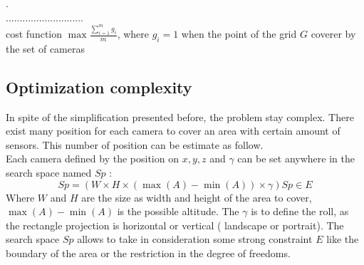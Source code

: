 .\\............................\\
 cost function  
 $\max{\frac{\sum^m_{i=1}{g_i}}{m}}$, where $g_i = 1$ when the point of the grid $G$ coverer by the set of cameras


%    


 
 \subsection{Optimization complexity} \label{sec:OptimizationComplexity}
 
In spite of the simplification presented before, the problem stay complex. There exist many position for each camera to cover an area with certain amount of sensors. This number of position can be estimate as follow.\\   
Each camera defined by the position on $x, y, z $ and $ \gamma$ can be set anywhere in the search space  named $Sp$ : 
\begin{equation}\label{eq:SearchSpace}
 Sp=(W\times H \times ( \max(A)-\min(A)) \times \gamma )  Sp \in E 
\end{equation}
Where $W$ and $H$ are the size as width and height of the area to cover, $\max(A)-\min(A)$  is the possible altitude. The $\gamma$ is to define the roll, as the rectangle projection is horizontal or vertical ( landscape or portrait). The search space $Sp$ allows to take in consideration some strong constraint $E$ like the boundary of the area or the restriction in the degree of freedoms.

